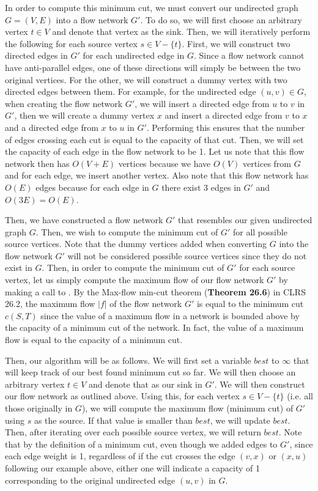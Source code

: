 \documentclass[11pt]{article}
\begin{document}
In order to compute this minimum cut, we must convert our undirected graph $G=(V,E)$ into a flow network $G'$. To do so, we will first choose an arbitrary vertex $t \in V$ and denote that vertex as the sink. Then, we will iteratively perform the following for each source vertex $s \in V - \{t\}$. First, we will construct two directed edges in $G'$ for each undirected edge in $G$. Since a flow network cannot have anti-parallel edges, one of these directions will simply be between the two original vertices. For the other, we will construct a dummy vertex with two directed edges between them. For example, for the undirected edge $(u,v) \in G$, when creating the flow network $G'$, we will insert a directed edge from $u$ to $v$ in $G'$, then we will create a dummy vertex $x$ and insert a directed edge from $v$ to $x$ and a directed edge from $x$ to $u$ in $G'$. Performing this ensures that the number of edges crossing each cut is equal to the capacity of that cut. Then, we will set the capacity of each edge in the flow network to be 1. Let us note that this flow network then has $O(V+E)$ vertices because we have $O(V)$ vertices from $G$ and for each edge, we insert another vertex. Also note that this flow network has $O(E)$ edges because for each edge in $G$ there exist 3 edges in $G'$ and $O(3E) = O(E)$.

Then, we have constructed a flow network $G'$ that resembles our given undirected graph $G$. Then, we wish to compute the minimum cut of $G'$ for all possible source vertices. Note that the dummy vertices added when converting $G$ into the flow network $G'$ will not be considered possible source vertices since they do not exist in $G$. Then, in order to compute the minimum cut of $G'$ for each source vertex, let us simply compute the maximum flow of our flow network $G'$ by making a call to . By the Max-flow min-cut theorem (\textbf{Theorem 26.6}) in CLRS 26.2, the maximum flow $|f|$ of the flow network $G'$ is equal to the minimum cut $c(S,T)$ since the value of a maximum flow in a network is bounded above by the capacity of a minimum cut of the network. In fact, the value of a maximum flow is equal to the capacity of a minimum cut.

Then, our algorithm will be as follows. We will first set a variable $best$ to $\infty$ that will keep track of our best found minimum cut so far. We will then choose an arbitrary vertex $t \in V$ and denote that as our sink in $G'$. We will then construct our flow network as outlined above. Using this, for each vertex $s \in V - \{t\}$ (i.e. all those originally in $G$), we will compute the maximum flow (minimum cut) of $G'$ using $s$ as the source. If that value is smaller than $best$, we will update $best$. Then, after iterating over each possible source vertex, we will return $best$. Note that by the definition of a minimum cut, even though we added edges to $G'$, since each edge weight is 1, regardless of if the cut crosses the edge $(v,x)$ or $(x,u)$ following our example above, either one will indicate a capacity of 1 corresponding to the original undirected edge $(u,v)$ in $G$.
\end{document}
